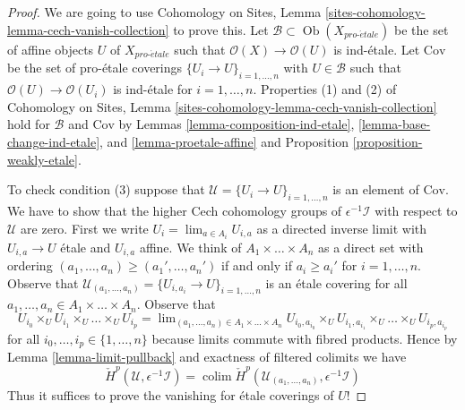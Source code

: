 \documentclass{stacks-project}
\theoremstyle{plain}
\theoremstyle{definition}
\theoremstyle{remark}
\numberwithin{equation}{subsection}
\def\lim{\mathop{\mathrm{lim}}\nolimits}
\def\colim{\mathop{\mathrm{colim}}\nolimits}
\def\Ob{\mathop{\mathrm{Ob}}\nolimits}
\def\proetale{{pro\text{-}\acute{e}tale}}
\begin{document}
\begin{proof}
We are going to use
Cohomology on Sites, Lemma \ref{sites-cohomology-lemma-cech-vanish-collection}
to prove this. Let $\mathcal{B} \subset \Ob(X_\proetale)$ be the set of affine
objects $U$ of $X_\proetale$ such that $\mathcal{O}(X) \to \mathcal{O}(U)$ is
ind-\'etale. Let $\text{Cov}$ be the set of pro-\'etale coverings
$\{U_i \to U\}_{i = 1, \ldots, n}$ with $U \in \mathcal{B}$ such that
$\mathcal{O}(U) \to \mathcal{O}(U_i)$ is ind-\'etale for $i = 1, \ldots, n$.
Properties (1) and (2) of
Cohomology on Sites, Lemma \ref{sites-cohomology-lemma-cech-vanish-collection}
hold for $\mathcal{B}$ and $\text{Cov}$ by
Lemmas \ref{lemma-composition-ind-etale},
\ref{lemma-base-change-ind-etale}, and
\ref{lemma-proetale-affine} and
Proposition \ref{proposition-weakly-etale}.

\medskip\noindent
To check condition (3) suppose that
$\mathcal{U} = \{U_i \to U\}_{i = 1, \ldots, n}$
is an element of $\text{Cov}$. We have to show that the higher
Cech cohomology groups of $\epsilon^{-1}\mathcal{I}$
with respect to $\mathcal{U}$ are zero.
First we write $U_i = \lim_{a \in A_i} U_{i, a}$ as a directed inverse limit
with $U_{i, a} \to U$ \'etale and $U_{i, a}$ affine.
We think of $A_1 \times \ldots \times A_n$ as a direct set
with ordering $(a_1, \ldots, a_n) \geq (a_1', \ldots, a_n')$
if and only if $a_i \geq a_i'$ for $i = 1, \ldots, n$.
Observe that
$\mathcal{U}_{(a_1, \ldots, a_n)} = \{U_{i, a_i} \to U\}_{i = 1, \ldots, n}$
is an \'etale covering for all
$a_1, \ldots, a_n \in A_1 \times \ldots \times A_n$.
Observe that
$$
U_{i_0} \times_U U_{i_1} \times_U \ldots \times_U U_{i_p}
=
\lim_{(a_1, \ldots, a_n) \in A_1 \times \ldots \times A_n}
U_{i_0, a_{i_0}} \times_U
U_{i_1, a_{i_1}} \times_U \ldots \times_U U_{i_p, a_{i_p}}
$$
for all $i_0, \ldots, i_p \in \{1, \ldots, n\}$ because limits
commute with fibred products. Hence by Lemma \ref{lemma-limit-pullback}
and exactness of filtered colimits we have
$$
\check{H}^p(\mathcal{U}, \epsilon^{-1}\mathcal{I}) =
\colim \check{H}^p(\mathcal{U}_{(a_1, \ldots, a_n)}, \epsilon^{-1}\mathcal{I}) 
$$
Thus it suffices to prove the vanishing for \'etale coverings
of $U$!


\end{proof}
\end{document}
